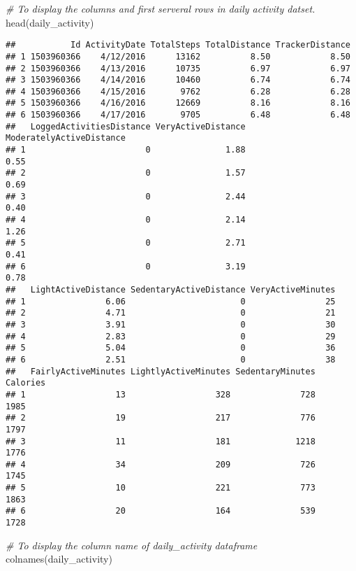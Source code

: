 \documentclass[
]{article}
\newenvironment{Shaded}{\begin{snugshade}}{\end{snugshade}}
\newcommand{\CommentTok}[1]{\textcolor[rgb]{0.56,0.35,0.01}{\textit{#1}}}
\newcommand{\FunctionTok}[1]{\textcolor[rgb]{0.00,0.00,0.00}{#1}}
\newcommand{\NormalTok}[1]{#1}
\begin{document}
\begin{Shaded}
\begin{Highlighting}[]
\CommentTok{\# To display the columns and first serveral rows in daily activity datset.}
\FunctionTok{head}\NormalTok{(daily\_activity)}
\end{Highlighting}
\end{Shaded}

\begin{verbatim}
##           Id ActivityDate TotalSteps TotalDistance TrackerDistance
## 1 1503960366    4/12/2016      13162          8.50            8.50
## 2 1503960366    4/13/2016      10735          6.97            6.97
## 3 1503960366    4/14/2016      10460          6.74            6.74
## 4 1503960366    4/15/2016       9762          6.28            6.28
## 5 1503960366    4/16/2016      12669          8.16            8.16
## 6 1503960366    4/17/2016       9705          6.48            6.48
##   LoggedActivitiesDistance VeryActiveDistance ModeratelyActiveDistance
## 1                        0               1.88                     0.55
## 2                        0               1.57                     0.69
## 3                        0               2.44                     0.40
## 4                        0               2.14                     1.26
## 5                        0               2.71                     0.41
## 6                        0               3.19                     0.78
##   LightActiveDistance SedentaryActiveDistance VeryActiveMinutes
## 1                6.06                       0                25
## 2                4.71                       0                21
## 3                3.91                       0                30
## 4                2.83                       0                29
## 5                5.04                       0                36
## 6                2.51                       0                38
##   FairlyActiveMinutes LightlyActiveMinutes SedentaryMinutes Calories
## 1                  13                  328              728     1985
## 2                  19                  217              776     1797
## 3                  11                  181             1218     1776
## 4                  34                  209              726     1745
## 5                  10                  221              773     1863
## 6                  20                  164              539     1728
\end{verbatim}

\begin{Shaded}
\begin{Highlighting}[]
\CommentTok{\# To display the column name of daily\_activity dataframe}
\FunctionTok{colnames}\NormalTok{(daily\_activity)}
\end{Highlighting}
\end{Shaded}
\end{document}
